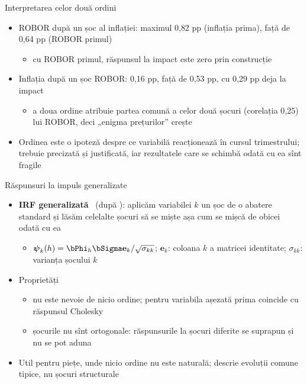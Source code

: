 \begin{frame}{Interpretarea celor două ordini}
\itemsize{\small}
\begin{itemize}
    \item ROBOR după un șoc al inflației: maximul 0{,}82 pp (inflația prima), față de 0{,}64 pp (ROBOR primul)
    \begin{itemize}
        \item cu ROBOR primul, răspunsul la impact este zero prin construcție
    \end{itemize}
    \item Inflația după un șoc ROBOR: 0{,}16 pp, față de 0{,}53 pp, cu 0{,}29 pp deja la impact
    \begin{itemize}
        \item a doua ordine atribuie partea comună a celor două șocuri (corelația 0{,}25) lui ROBOR, deci „enigma prețurilor” crește
    \end{itemize}
    \item Ordinea este o ipoteză despre ce variabilă reacționează în cursul trimestrului; trebuie precizată și justificată, iar rezultatele care se schimbă odată cu ea sînt fragile
\end{itemize}
\end{frame}

\begin{frame}{Răspunsuri la impuls generalizate}
\itemsize{\small}
\begin{itemize}
    \item \textbf{IRF generalizată} \ (după ): aplicăm variabilei $k$ un șoc de o abatere standard și lăsăm celelalte șocuri să se miște așa cum se mișcă de obicei odată cu ea
    \begin{itemize}
        \item $\boldsymbol{\psi}_k(h) = \bPhi_h\bSigma\mathbf{e}_k/\sqrt{\sigma_{kk}}$; $\mathbf{e}_k$: coloana $k$ a matricei identitate; $\sigma_{kk}$: varianța șocului $k$
    \end{itemize}
    \item Proprietăți
    \begin{itemize}
        \item nu este nevoie de nicio ordine; pentru variabila așezată prima coincide cu răspunsul Cholesky
        \item șocurile nu sînt ortogonale: răspunsurile la șocuri diferite se suprapun și nu se pot aduna
    \end{itemize}
    \item Util pentru piețe, unde nicio ordine nu este naturală; descrie evoluții comune tipice, nu șocuri structurale
\end{itemize}
\end{frame}

